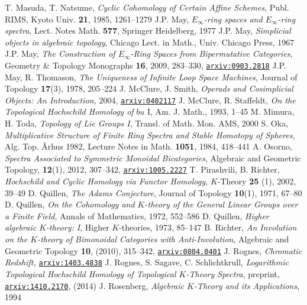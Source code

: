 \documentclass[12pt,bibliography=totoc,final]{scrbook} %
\def\arxiv#1{\href{http://arxiv.org/abs/#1}{\texttt{arxiv:#1}}} \def\arxivold#1{\href{http://arxiv.org/abs/math/#1}{\texttt{arxiv:#1}}}
\begin{document}
\begin{thebibliography}{9999999}
 T. Masuda, T. Natsume, \emph{Cyclic Cohomology of Certain Affine Schemes,}
Publ. RIMS, Kyoto Univ. \textbf{21}, 1985, 1261--1279
 J.P. May, \emph{$E_\infty$-ring spaces and $E_\infty$-ring spectra}, Lect. Notes Math. \textbf{577}, Springer Heidelberg, 1977 
 J.P. May, \emph{Simplicial objects in algebraic topology}, Chicago Lect. in Math., Univ. Chicago Press, 1967
 J.P. May, \emph{The Construction of $E_\infty$-Ring Spaces from 
Bipermutative Categories}, Geometry \& Topology Monographs \textbf{16}, 2009, 283--330, \arxiv{0903.2818}
 J.P. May, R. Thomason, \emph{The Uniqueness of Infinite Loop Space 
Machines}, {Journal of Topology \textbf{17}(3)}, 1978, 205--224%
 J. McClure, J. Smith, \emph{Operads and Cosimplicial Objects: An Introduction,} 2004, \arxivold{0402117}
 J. McClure, R. Staffeldt, \emph{On the Topological Hochschild Homology
of} $bu$ I, Am. J. Math., 1993, 1--45 %
 M. Mimura, H. Toda, \emph{Topology of Lie Groups I}, Transl. of Math. Mon. AMS, 2000
 S. Oka, \emph{Multiplicative Structure of Finite Ring Spectra and Stable
Homotopy of Spheres,} Alg. Top. \AA rhus 1982, Lecture Notes in Math. \textbf{1051}, 1984, 418--441
 A. Osorno, \emph{Spectra Associated to Symmetric Monoidal
Bicategories}, Algebraic and Geometric Topology, \textbf{12}(1), 2012, 307--342, \arxiv{1005.2227}
 T. Pirashvili, B. Richter, \emph{Hochschild and Cyclic Homology via Functor Homology,} 
$K$-Theory \textbf{25} (1), 2002, 39--49 %
 D. Quillen, \emph{The Adams Conjecture}, {Journal of Topology \textbf{10}(1)}, 1971, 67--80 %
 D. Quillen, \emph{On the Cohomology and $K$-theory of the General Linear 
Groups over a Finite Field}, {Annals of Mathematics}, 1972, 552--586 %
 D. Quillen, \emph{Higher algebraic $K$-theory: I}, {Higher $K$-theories}, 1973, 85--147 %
 B. Richter, \emph{An Involution on the $K$-theory of Bimonoidal 
Categories with Anti-Involution}, Algebraic and Geometric Topology \textbf{10}, (2010), 315--342, \arxiv{0804.0401}
 J. Rognes, \emph{Chromatic Redshift,} \arxiv{1403.4838}
 J. Rognes, S. Sagave, C. Schlichtkrull, \emph{Logarithmic Topological 
Hochschild Homology of Topological $K$-Theory Spectra}, preprint, \arxiv{1410.2170}, (2014)
 J. Rosenberg, \emph{Algebraic $K$-Theory and its Applications}, 1994 %

\end{thebibliography}
\end{document}
